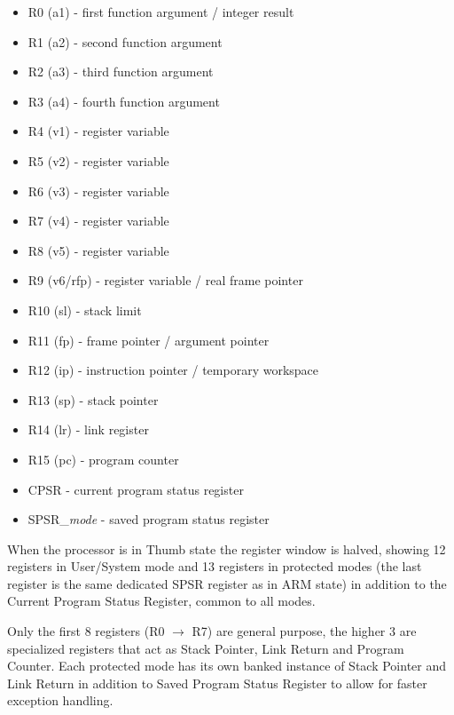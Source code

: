 \begin{itemize}
\item R0 (a1) - first function argument / integer result
\item R1 (a2) - second function argument
\item R2 (a3) - third function argument
\item R3 (a4) - fourth function argument
\item R4 (v1) - register variable
\item R5 (v2) - register variable
\item R6 (v3) - register variable
\item R7 (v4) - register variable
\item R8 (v5) - register variable
\item R9 (v6/rfp) - register variable / real frame pointer
\item R10 (sl) - stack limit
\item R11 (fp) - frame pointer / argument pointer
\item R12 (ip) - instruction pointer / temporary workspace
\item R13 (sp) - stack pointer
\item R14 (lr) - link register
\item R15 (pc) - program counter
\item CPSR - current program status register
\item SPSR\_\emph{mode} - saved program status register
\end{itemize}

When the processor is in Thumb state the register window is halved, showing 12 registers in User/System mode and 13 registers in protected modes (the last register is the same dedicated SPSR register as in ARM state) in addition to the Current Program Status Register, common to all modes. 

Only the first 8 registers (R0 $\rightarrow$ R7) are general purpose, the higher 3 are specialized registers that act as Stack Pointer, Link Return and Program Counter. Each protected mode has its own banked instance of Stack Pointer and Link Return in addition to Saved Program Status Register to allow for faster exception handling. 

\vspace{5px}
\begin{adjustbox}{center}

\end{adjustbox}
\vspace{5px}

